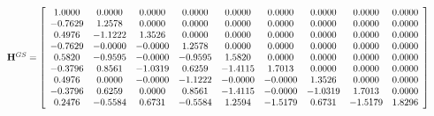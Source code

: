 \begin{equation}
\resizebox{\linewidth}{!}{
$\mathbf{H}^{GS} = \left[
\begin{array}{ccccccccc}
1.0000 & 0.0000 & 0.0000 & 0.0000 & 0.0000 & 0.0000 & 0.0000 & 0.0000 & 0.0000 \\
-0.7629 & 1.2578 & 0.0000 & 0.0000 & 0.0000 & 0.0000 & 0.0000 & 0.0000 & 0.0000 \\
0.4976 & -1.1222 & 1.3526 & 0.0000 & 0.0000 & 0.0000 & 0.0000 & 0.0000 & 0.0000 \\
-0.7629 & -0.0000 & -0.0000 & 1.2578 & 0.0000 & 0.0000 & 0.0000 & 0.0000 & 0.0000 \\
0.5820 & -0.9595 & -0.0000 & -0.9595 & 1.5820 & 0.0000 & 0.0000 & 0.0000 & 0.0000 \\
-0.3796 & 0.8561 & -1.0319 & 0.6259 & -1.4115 & 1.7013 & 0.0000 & 0.0000 & 0.0000 \\
0.4976 & 0.0000 & -0.0000 & -1.1222 & -0.0000 & -0.0000 & 1.3526 & 0.0000 & 0.0000 \\
-0.3796 & 0.6259 & 0.0000 & 0.8561 & -1.4115 & -0.0000 & -1.0319 & 1.7013 & 0.0000 \\
0.2476 & -0.5584 & 0.6731 & -0.5584 & 1.2594 & -1.5179 & 0.6731 & -1.5179 & 1.8296 \\
\end{array}
\right]\label{eq:H_GS}$}
\end{equation}
